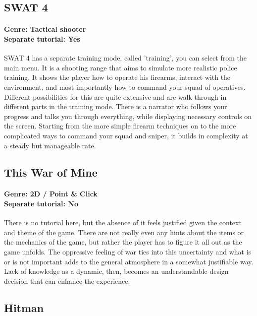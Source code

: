 \subsection{SWAT 4}
\paragraph{Genre: Tactical shooter \\ Separate tutorial: Yes \\}
SWAT 4 has a separate training mode, called 'training', you can select from the main menu. It is a shooting range that aims to simulate more realistic police training. It shows the player how to operate his firearms, interact with the environment, and most importantly how to command your squad of operatives. Different possibilities for this are quite extensive and are walk through in different parts in the training mode. There is a narrator who follows your progress and talks you through everything, while displaying necessary controls on the screen. Starting from the more simple firearm techniques on to the more complicated ways to command your squad and sniper, it builds in complexity at a steady but manageable rate.

\subsection{This War of Mine}
\paragraph{Genre: 2D / Point \& Click \\ Separate tutorial: No \\}
There is no tutorial here, but the absence of it feels justified given the context and theme of the game. There are not really even any hints about the items or the mechanics of the game, but rather the player has to figure it all out as the game unfolds. The oppressive feeling of war ties into this uncertainty and what is or is not important adds to the general atmosphere in a somewhat justifiable way. Lack of knowledge as a dynamic, then, becomes an understandable design decision that can enhance the experience.

\subsection{Hitman}
